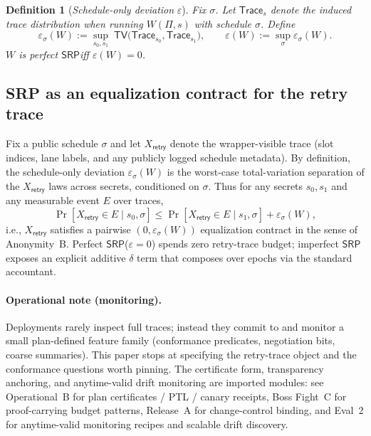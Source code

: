 \documentclass[11pt]{article}
\newtheorem{definition}{Definition}
\newcommand{\SRP}{\ensuremath{\mathsf{SRP}}}
\newcommand{\tv}{\ensuremath{\mathsf{TV}}}
\begin{document}
\begin{definition}[\emph{Schedule-only deviation} $\varepsilon$]
Fix $\sigma$.
Let $\mathsf{Trace}_{s}$ denote the induced trace distribution when running $W(\Pi,s)$ with schedule $\sigma$.
Define
\[\varepsilon_{\sigma}(W) := \sup_{s_0,s_1}\; \tv\big(\mathsf{Trace}_{s_0},\mathsf{Trace}_{s_1}\big),\qquad \varepsilon(W):=\sup_{\sigma}\varepsilon_{\sigma}(W).\]
$W$ is perfect \SRP iff $\varepsilon(W)=0$.
\end{definition}

\subsection*{SRP as an equalization contract for the retry trace}
Fix a public schedule $\sigma$ and let $X_{\mathsf{retry}}$ denote the wrapper-visible trace (slot indices, lane labels, and any publicly logged schedule metadata).
By definition, the schedule-only deviation $\varepsilon_{\sigma}(W)$ is the worst-case total-variation separation of the $X_{\mathsf{retry}}$ laws across secrets, conditioned on $\sigma$.
Thus for any secrets $s_0,s_1$ and any measurable event $E$ over traces,
\[
\Pr[X_{\mathsf{retry}}\in E\mid s_0,\sigma]\le \Pr[X_{\mathsf{retry}}\in E\mid s_1,\sigma]+\varepsilon_{\sigma}(W),
\]
i.e., $X_{\mathsf{retry}}$ satisfies a pairwise $(0,\varepsilon_{\sigma}(W))$ equalization contract in the sense of Anonymity~B.\cite{series:profiling}
Perfect \SRP ($\varepsilon=0$) spends zero retry-trace budget; imperfect \SRP exposes an explicit additive $\delta$ term that composes over epochs via the standard accountant.\cite{series:profiling}

\paragraph{Operational note (monitoring).}
Deployments rarely inspect full traces; instead they commit to and monitor a small plan-defined feature family (conformance predicates, negotiation bits, coarse summaries).
This paper stops at specifying the retry-trace object and the conformance questions worth pinning. The certificate form, transparency anchoring, and anytime-valid drift monitoring are imported modules: see Operational~B for plan certificates / PTL / canary receipts, Boss Fight~C for proof-carrying budget patterns, Release~A for change-control binding, and Eval~2 for anytime-valid monitoring recipes and scalable drift discovery.\cite{series:operationalB,series:proofcarryingbudgets,series:releaseproperty,series:advantagecontracts}
\end{document}
